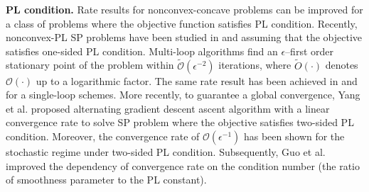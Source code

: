 \documentclass[letterpaper,11 pt]{article}
\newcommand{\za}[1]{{\color{black}#1}}
\newcommand{\afj}[1]{{\color{black}#1}}
\newcommand{\mb}[1]{{\color{black}#1}}
\begin{document}
{\bf PL condition.} Rate results for nonconvex-concave problems can be improved for a class of problems where the objective function satisfies PL condition. Recently, nonconvex-PL SP problems have been studied in \cite{nouiehed2019solving,anagnostidis2021direct} and \cite{yang2022faster} assuming that the objective satisfies one-sided PL condition. Multi-loop algorithms \cite{nouiehed2019solving,anagnostidis2021direct} find an $\epsilon$–first order stationary
point of the problem within \mb{$\mathcal{\tilde O} (\epsilon^{-2})$} iterations, where $\tilde O(\cdot)$  denotes $\mathcal O(\cdot)$ up to a logarithmic factor. The same rate result has been achieved in \cite{fiez2021global} and \cite{yang2022faster} for a single-loop schemes.  More recently, to guarantee a global convergence, Yang et al. \cite{yang2020global} proposed alternating gradient descent ascent algorithm with a linear convergence rate to solve SP problem where the objective satisfies two-sided PL condition. Moreover, the convergence rate of $\mathcal O(\epsilon^{-1})$ has been shown for the stochastic regime under two-sided PL condition. Subsequently, Guo et al. \cite{guo2020fast} improved the dependency of convergence rate on the condition number (the ratio of smoothness parameter to the PL constant).
\end{document}

